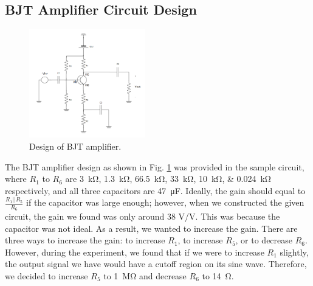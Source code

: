 \documentclass[journal]{IEEEtran}
\begin{document}
\subsection{BJT Amplifier Circuit Design} \label{1.1}
\begin{figure}[h]
  \centering
  \includegraphics[width=0.45\textwidth]{images/circuit.png}
  \caption{Design of BJT amplifier.}
  \label{fig-1-1}
\end{figure}
\par The BJT amplifier design as shown in Fig. \ref{fig-1-1} was provided in the
sample circuit, where $R_{1}$ to $R_{6}$ are \SIlist{3;1.3;66.5;33;10;0.024}{\kilo\ohm}
respectively, and all three capacitors are \SI{47}{\micro\F}. Ideally, the gain should equal to $\frac{R_{1} || R_{5}}{R_{6}}$ if the capacitor was large enough; however, when we constructed the given circuit, the gain we found was only around 38 \si{\volt}/\si{\volt}. This was because the capacitor was not ideal.
As a result, we wanted to increase the gain. There are three ways to increase the gain:
to increase $R_{1}$, to increase $R_{5}$, or to decrease $R_{6}$. However, during the experiment, we found that if we were to increase $R_{1}$ slightly, the output signal we have would have a cutoff region on its sine wave.
Therefore, we decided to increase $R_{5}$ to \SI{1}{\Mohm} and decrease $R_{6}$ to \SI{14}{\ohm}.
\end{document}
